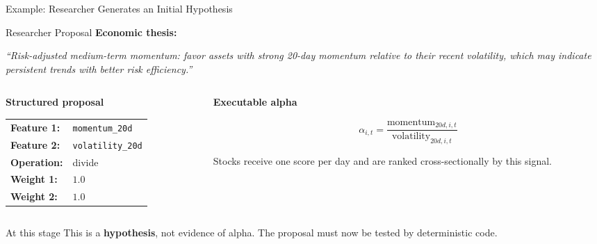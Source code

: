\documentclass[10pt,aspectratio=169]{beamer}
\newcommand{\code}[1]{\texttt{\small #1}}
\begin{document}
\begin{frame}{Example: Researcher Generates an Initial Hypothesis}

\small

\begin{block}{Researcher Proposal}
\textbf{Economic thesis:}

\vspace{0.08cm}

\emph{``Risk-adjusted medium-term momentum: favor assets with strong
20-day momentum relative to their recent volatility, which may indicate
persistent trends with better risk efficiency.''}
\end{block}

\vspace{0.18cm}

\begin{columns}[T,onlytextwidth]

\begin{column}{0.46\textwidth}

\textbf{Structured proposal}

\vspace{0.1cm}

\begin{tabular}{ll}
\textbf{Feature 1:} & \code{momentum\_20d} \\[2pt]
\textbf{Feature 2:} & \code{volatility\_20d} \\[2pt]
\textbf{Operation:} & divide \\[2pt]
\textbf{Weight 1:} & $1.0$ \\[2pt]
\textbf{Weight 2:} & $1.0$
\end{tabular}

\end{column}

\begin{column}{0.50\textwidth}

\textbf{Executable alpha}

\vspace{0.15cm}

\[
\alpha_{i,t}
=
\boxed{
\frac{
\text{momentum}_{20d,i,t}
}{
\text{volatility}_{20d,i,t}
}
}
\]

\vspace{0.12cm}

{\footnotesize
Stocks receive one score per day and are ranked
cross-sectionally by this signal.
}

\end{column}

\end{columns}

\vfill

\begin{block}{At this stage}
This is a \textbf{hypothesis}, not evidence of alpha.
The proposal must now be tested by deterministic code.
\end{block}

\end{frame}
\end{document}
